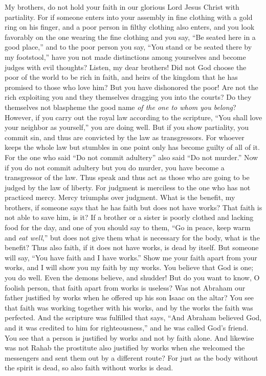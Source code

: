 \begin{biblechapter} %
 My brothers, do not hold your faith in our glorious Lord Jesus Christ with partiality.
\verse For if someone enters into your assembly in fine clothing with a gold ring on his finger, and a poor person in filthy clothing also enters,
\verse and you look favorably on the one wearing the fine clothing and you say, “Be seated here in a good place,” and to the poor person you say, “You stand or be seated there by my footstool,”
\verse have you not made distinctions among yourselves and become judges with evil thoughts?
\verse Listen, my dear brothers! Did not God choose the poor of the world to be rich in faith, and heirs of the kingdom that he has promised to those who love him?
\verse But you have dishonored the poor! Are not the rich exploiting you and they themselves dragging you into the courts?
\verse Do they themselves not blaspheme the good name \textit{of the one to whom you belong}?
\verse However, if you carry out the royal law according to the scripture, “You shall love your neighbor as yourself,” you are doing well.
\verse But if you show partiality, you commit sin, and thus are convicted by the law as transgressors.
\verse For whoever keeps the whole law but stumbles in one point only has become guilty of all of it.
\verse For the one who said “Do not commit adultery” also said “Do not murder.” Now if you do not commit adultery but you do murder, you have become a transgressor of the law.
\verse Thus speak and thus act as those who are going to be judged by the law of liberty.
\verse For judgment is merciless to the one who has not practiced mercy. Mercy triumphs over judgment.
 What is the benefit, my brothers, if someone says that he has faith but does not have works? That faith is not able to save him, is it?
\verse If a brother or a sister is poorly clothed and lacking food for the day,
\verse and one of you should say to them, “Go in peace, keep warm and \textit{eat well},” but does not give them what is necessary for the body, what is the benefit?
\verse Thus also faith, if it does not have works, is dead by itself.
\verse But someone will say, “You have faith and I have works.” Show me your faith apart from your works, and I will show you my faith by my works.
\verse You believe that God is one; you do well. Even the demons believe, and shudder!
\verse But do you want to know, O foolish person, that faith apart from works is useless?
\verse Was not Abraham our father justified by works when he offered up his son Isaac on the altar?
\verse You see that faith was working together with his works, and by the works the faith was perfected.
\verse And the scripture was fulfilled that says, “And Abraham believed God, and it was credited to him for righteousness,” and he was called God’s friend.
\verse You see that a person is justified by works and not by faith alone.
\verse And likewise was not Rahab the prostitute also justified by works when she welcomed the messengers and sent them out by a different route?
\verse For just as the body without the spirit is dead, so also faith without works is dead.
\end{biblechapter}

